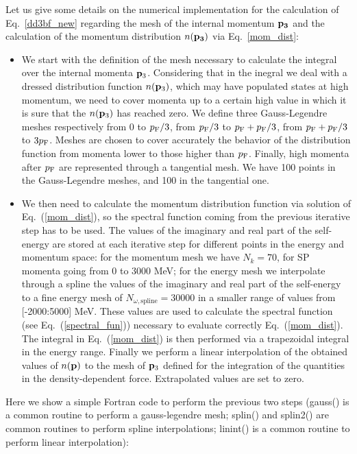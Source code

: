 Let us give some details on the numerical implementation for the calculation of Eq.~\ref{dd3bf_new} regarding the mesh of the internal momentum ${\bf p_3}$ and the calculation of the momentum distribution $n({\bf p_3})$ via Eq.~\ref{mom_dist}:
\begin{itemize}
\item We start with the definition of the mesh necessary to calculate the integral over the internal momenta ${\bf p}_3$. Considering that in the inegral we deal with a dressed distribution function $n({\bf p}_3)$, which may have populated states at high momentum, we need to cover momenta up to a certain high value in which it is sure that the $n({\bf p}_3)$ has reached zero. We define three Gauss-Legendre meshes respectively from $0$ to $p_\textrm F/3$, from $p_\textrm F/3$ to $p_\textrm F+p_\textrm F/3$, from $p_\textrm F+p_\textrm F/3$ to $3p_\textrm F$. Meshes are chosen to cover accurately the behavior of the distribution function from momenta lower to those higher than $p_\textrm F$. Finally, high momenta after $p_\textrm F$ are represented through a tangential mesh. We have 100  points in the Gauss-Legendre meshes, and 100 in the tangential one. 
\item We then need to calculate the momentum distribution function via solution of Eq.~(\ref{mom_dist}), so the spectral function coming from the previous iterative step has to be used. The values of the imaginary and real part of the self-energy are stored at each iterative step for different points in the energy and momentum space: for the momentum mesh we have $N_k=70$, for SP momenta going from 0 to 3000 MeV; for the energy mesh we interpolate through a spline the values of the imaginary and real part of the self-energy to a fine energy mesh of $N_{\omega,\textrm{spline}}=30000$ in a smaller range of values from [-2000:5000] MeV. These values are used to calculate the spectral function (see Eq.~(\ref{spectral_fun})) necessary to evaluate correctly Eq.~(\ref{mom_dist}). The integral in Eq.~(\ref{mom_dist}) is then performed via a trapezoidal integral in the energy range. Finally we perform a linear interpolation of the obtained values of $n({\bf p})$ to the mesh of ${\bf p}_3$ defined for the integration of the quantities in the density-dependent force. Extrapolated values are set to zero.
\end{itemize}

\noindent
Here we show a simple Fortran code to perform the previous two steps (gauss() is a common routine to perform a gauss-legendre mesh; splin() and splin2() are common routines to perform spline interpolations; linint() is a common routine to perform linear interpolation):

